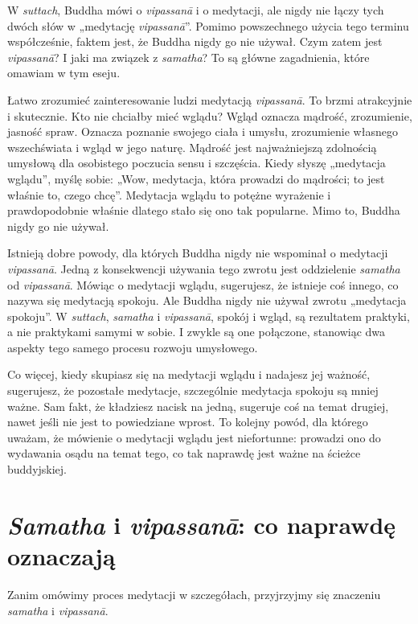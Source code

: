 \documentclass[12pt,openany]{book}
\begin{document}
\pagestyle{fancy}

W \textit{suttach}, Buddha mówi o \textit{vipassanā} i o medytacji, ale nigdy nie łączy tych dwóch słów w „medytację \textit{vipassanā}”. Pomimo powszechnego użycia tego terminu współcześnie, faktem jest, że Buddha nigdy go nie używał. Czym zatem jest \textit{vipassanā}? I jaki ma związek z \textit{samatha}? To są główne zagadnienia, które omawiam w tym eseju.

Łatwo zrozumieć zainteresowanie ludzi medytacją \textit{vipassanā}. To brzmi atrakcyjnie i skutecznie. Kto nie chciałby mieć wglądu? Wgląd oznacza mądrość, zrozumienie, jasność spraw. Oznacza poznanie swojego ciała i umysłu, zrozumienie własnego wszechświata i wgląd w jego naturę. Mądrość jest najważniejszą zdolnością umysłową dla osobistego poczucia sensu i szczęścia. Kiedy słyszę „medytacja wglądu”, myślę sobie: „Wow, medytacja, która prowadzi do mądrości; to jest właśnie to, czego chcę”. Medytacja wglądu to potężne wyrażenie i prawdopodobnie właśnie dlatego stało się ono tak popularne. Mimo to, Buddha nigdy go nie używał.

Istnieją dobre powody, dla których Buddha nigdy nie wspominał o medytacji \textit{vipassanā}. Jedną z konsekwencji używania tego zwrotu jest oddzielenie \textit{samatha} od \textit{vipassanā}. Mówiąc o medytacji wglądu, sugerujesz, że istnieje coś innego, co nazywa się medytacją spokoju. Ale Buddha nigdy nie używał zwrotu „medytacja spokoju”. W \textit{suttach}, \textit{samatha} i \textit{vipassanā}, spokój i wgląd, są rezultatem praktyki, a nie praktykami samymi w sobie. I zwykle są one połączone, stanowiąc dwa aspekty tego samego procesu rozwoju umysłowego.

Co więcej, kiedy skupiasz się na medytacji wglądu i nadajesz jej ważność, sugerujesz, że pozostałe medytacje, szczególnie medytacja spokoju są mniej ważne. Sam fakt, że kładziesz nacisk na jedną, sugeruje coś na temat drugiej, nawet jeśli nie jest to powiedziane wprost. To kolejny powód, dla którego uważam, że mówienie o medytacji wglądu jest niefortunne: prowadzi ono do wydawania osądu na temat tego, co tak naprawdę jest ważne na ścieżce buddyjskiej.

\chapter*{\textit{Samatha} i \textit{vipassanā}: co naprawdę oznaczają}

Zanim omówimy proces medytacji w szczegółach, przyjrzyjmy się znaczeniu  \textit{samatha} i \textit{vipassanā}.
\end{document}
